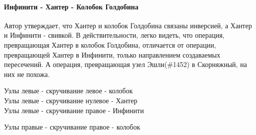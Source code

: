 \paragraph{Инфинити - Хантер - Колобок Голдобина}
Автор утверждает, что Хантер и колобок Голдобина связаны инверсией, а Хантер и Инфинити - свивкой.
В действительности, легко видеть, что операция, превращающая Хантер в колобок Голдобина, отличается от операции, превращающей Хантер в Инфинити, только направлением создаваемых пересечений. А операция, превращающая узел Эшли(\#1452) в Скорняжный, на них не похожа.

Узлы левые - скручивание левое - колобок\\
Узлы левые - скручивание нулевое - Хантер\\
Узлы левые - скручивание правое - Инфинити

Узлы правые - скручивание правое - колобок



